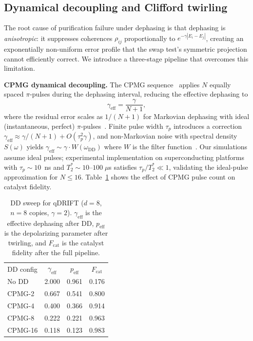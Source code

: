 \documentclass[prx,twocolumn,superscriptaddress,longbibliography,floatfix]{revtex4-2}
\begin{document}
\subsection{Dynamical decoupling and Clifford twirling}
\label{sec:dd_twirl}

The root cause of purification failure under dephasing is that dephasing is \emph{anisotropic}: it suppresses coherences $\rho_{ij}$ proportionally to $e^{-\gamma|E_i - E_j|}$, creating an exponentially non-uniform error profile that the swap test's symmetric projection cannot efficiently correct.
We introduce a three-stage pipeline that overcomes this limitation.

\textbf{CPMG dynamical decoupling.}
The CPMG sequence~\cite{MeiboomGill1958,Viola1999} applies $N$ equally spaced $\pi$-pulses during the dephasing interval, reducing the effective dephasing to
\begin{equation}
\gamma_\mathrm{eff} = \frac{\gamma}{N + 1},
\label{eq:dd_gamma}
\end{equation}
where the residual error scales as $1/(N+1)$ for Markovian dephasing with ideal (instantaneous, perfect) $\pi$-pulses~\cite{Viola1999}.
Finite pulse width $\tau_p$ introduces a correction $\gamma_\mathrm{eff} \approx \gamma/(N+1) + O(\tau_p^2 \gamma)$, and non-Markovian noise with spectral density $S(\omega)$ yields $\gamma_\mathrm{eff} \sim \gamma \cdot W(\omega_{\mathrm{DD}})$ where $W$ is the filter function~\cite{Viola1999}.
Our simulations assume ideal pulses; experimental implementation on superconducting platforms with $\tau_p \sim 10$~ns and $T_2^* \sim 10$--$100\;\mu$s satisfies $\tau_p / T_2^* \ll 1$, validating the ideal-pulse approximation for $N \leq 16$.
Table~\ref{tab:dd_sweep} shows the effect of CPMG pulse count on catalyst fidelity.

\begin{table}[tb]
\caption{DD sweep for qDRIFT ($d = 8$, $n = 8$ copies, $\gamma = 2$). $\gamma_\mathrm{eff}$ is the effective dephasing after DD, $p_\mathrm{eff}$ is the depolarizing parameter after twirling, and $F_\mathrm{cat}$ is the catalyst fidelity after the full pipeline.}
\label{tab:dd_sweep}
\begin{ruledtabular}
\begin{tabular}{lccc}
DD config & $\gamma_\mathrm{eff}$ & $p_\mathrm{eff}$ & $F_\mathrm{cat}$ \\
\colrule
No DD & 2.000 & 0.961 & 0.176 \\
CPMG-2 & 0.667 & 0.541 & 0.800 \\
CPMG-4 & 0.400 & 0.366 & 0.914 \\
CPMG-8 & 0.222 & 0.221 & 0.963 \\
CPMG-16 & 0.118 & 0.123 & 0.983 \\
\end{tabular}
\end{ruledtabular}
\end{table}
\end{document}
